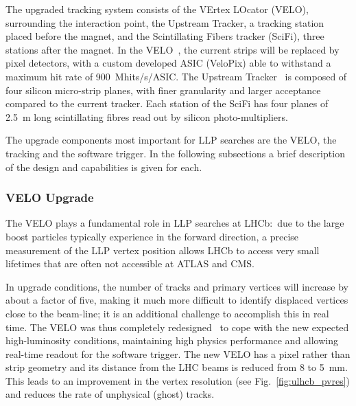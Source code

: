 The upgraded tracking system consists of the VErtex LOcator (VELO), surrounding the interaction point, the Upstream Tracker, a tracking station placed before the magnet, and the Scintillating Fibers tracker (SciFi), three stations after the magnet. In the VELO~\cite{LHCb-TDR-013}, the current strips will be replaced by pixel detectors, with a custom developed ASIC (VeloPix) able to withstand a maximum hit rate of 900~Mhits/s/ASIC. The Upstream Tracker~\cite{LHCb-TDR-015} is composed of four silicon micro-strip planes, with finer granularity and larger acceptance compared to the current tracker. Each station of the SciFi has four planes of 2.5~m long scintillating fibres read out by silicon photo-multipliers.

The upgrade components most important for LLP searches are the VELO, the tracking and the software trigger. In the following subsections a brief description of the design and capabilities is given for each.

\subsubsection{VELO Upgrade}

The VELO plays a fundamental role in LLP searches at LHCb:~due to the large boost particles typically experience in the forward direction, a precise measurement of the LLP vertex position allows LHCb to access very small lifetimes that are often not accessible at ATLAS and CMS.

In upgrade conditions, the number of tracks and primary vertices will increase by about a factor of five, making it much more difficult to identify displaced vertices close to the beam-line; it is an additional challenge to accomplish this in real time. The VELO was thus completely redesigned~\cite{LHCb-TDR-013} to cope with the new expected high-luminosity conditions, maintaining high physics performance and allowing real-time readout for the software trigger. The new VELO has a pixel rather than strip geometry and its distance from the LHC beams is reduced from 8 to 5~mm. This leads to an improvement in the vertex resolution (see Fig.~\ref{fig:ulhcb_pvres}) and reduces the rate of unphysical (ghost) tracks.

